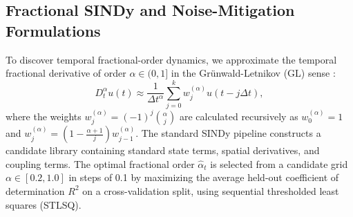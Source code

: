 \documentclass[review,3p,times]{elsarticle}
\begin{document}
\subsection{Fractional SINDy and Noise-Mitigation Formulations}
To discover temporal fractional-order dynamics, we approximate the temporal fractional derivative of order $\alpha \in (0, 1]$ in the Gr\"unwald-Letnikov (GL) sense \cite{podlubny1999fractional}:
\begin{equation}
D^{\alpha}_t u(t) \approx \frac{1}{\Delta t^{\alpha}} \sum_{j=0}^{k} w_j^{(\alpha)} u(t - j\Delta t),
\end{equation}
where the weights $w_j^{(\alpha)} = (-1)^j \binom{\alpha}{j}$ are calculated recursively as $w_0^{(\alpha)} = 1$ and $w_j^{(\alpha)} = (1 - \frac{\alpha+1}{j}) w_{j-1}^{(\alpha)}$. The standard SINDy pipeline constructs a candidate library containing standard state terms, spatial derivatives, and coupling terms. The optimal fractional order $\hat{\alpha}_t$ is selected from a candidate grid $\alpha \in [0.2, 1.0]$ in steps of 0.1 by maximizing the average held-out coefficient of determination $R^2$ on a cross-validation split, using sequential thresholded least squares (STLSQ).
\end{document}
